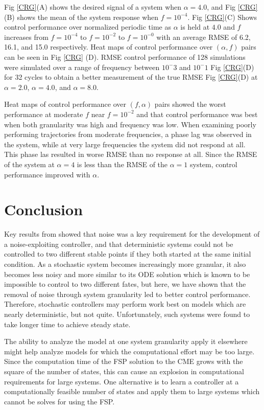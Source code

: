 \documentclass[12pt]{iopart}
\begin{document}
Fig \ref{CRG}(A) shows the desired signal of a system when $\alpha = 4.0$, and Fig \ref{CRG}(B) shows the mean of the system response when $f=10^{-4}$. Fig \ref{CRG}(C) Shows control performance over normalized periodic time as $\alpha$ is held at $4.0$ and $f$ increases from $f=10^{-4}$ to $f=10^{-2}$ to $f=10^{-0}$ with an average RMSE of 6.2, 16.1, and 15.0 respectively. Heat maps of control performance over $(\alpha,f)$ pairs can be seen in Fig \ref{CRG} (D). RMSE control performance of 128 simulations were simulated over a range of frequency between $10^-3$ and $10^-1$ Fig \ref{CRG}(D) for 32 cycles to obtain a better measurement of the true RMSE Fig \ref{CRG}(D) at $\alpha=2.0$, $\alpha=4.0$, and $\alpha=8.0$. 

Heat maps of control performance over $(f,\alpha)$ pairs showed the worst performance at moderate $f$ near $f=10^{-2}$ and that control performance was best when both granularity was high and frequency was low. When examining poorly performing trajectories from moderate frequencies, a phase lag was observed in the system, while at very large frequencies the system did not respond at all. This phase las resulted in worse RMSE than no response at all.  Since the RMSE of the system at $\alpha=4$ is less than the RMSE of the $\alpha=1$ system, control performance improved with $\alpha$. 


\section{Conclusion}

Key results from \cite{May2021} showed that noise was a key requirement for the development of a noise-exploiting controller, and that deterministic systems could not be controlled to two different stable points if they both started at the same initial condition. As a stochastic system becomes increasingly more granular, it also becomes less noisy and more similar to its ODE solution which is known to be impossible to control to two different fates, but here, we have shown that the removal of noise through system granularity led to better control performance.  Therefore, stochastic controllers may perform work best on models which are nearly deterministic, but not quite. Unfortunately, such systems were found to take longer time to achieve steady state.

The ability to analyze the model at one system granularity apply it elsewhere might help analyze models for which the computational effort may be too large. Since the computation time of the FSP solution to the CME grows with the square of the number of states, this can cause an explosion in computational requirements for large systems. One alternative is to learn a controller at a computationally feasible number of states and apply them to large systems which cannot be solves for using the FSP. 
\end{document}

